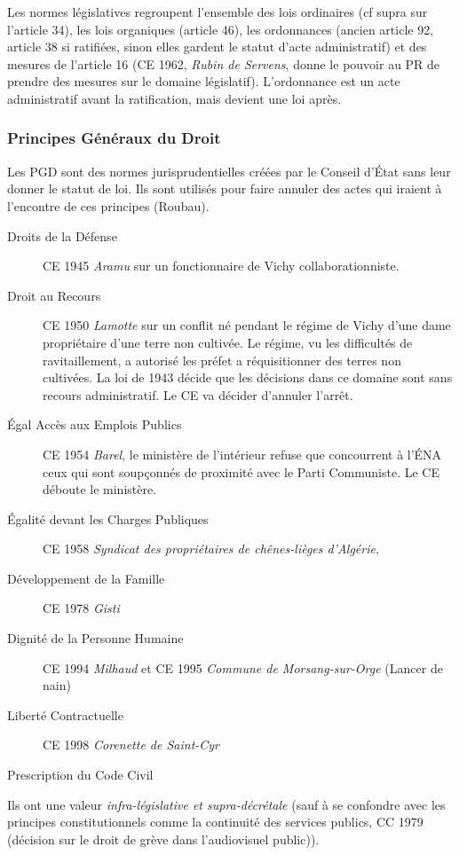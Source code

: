 \documentclass[math]{cours}
\begin{document}
Les normes législatives regroupent l'ensemble des lois ordinaires (cf supra sur l'article 34), les lois organiques (article 46), les ordonnances (ancien article 92, article 38 si ratifiées, sinon elles gardent le statut d'acte administratif) et des mesures de l'article 16 (CE 1962, \emph{Rubin de Servens}, donne le pouvoir au PR de prendre des mesures sur le domaine législatif).
L'ordonnance est un acte administratif avant la ratification, mais devient une loi après.

\subsubsection{Principes Généraux du Droit}
Les PGD sont des normes jurisprudentielles créées par le Conseil d'État sans leur donner le statut de loi.
Ils sont utilisés pour faire annuler des actes qui iraient à l'encontre de ces principes (Roubau).
\begin{description}
	\item[Droits de la Défense] CE 1945 \emph{Aramu} sur un fonctionnaire de Vichy collaborationniste.
	\item[Droit au Recours] CE 1950 \emph{Lamotte} sur un conflit né pendant le régime de Vichy d'une dame propriétaire d'une terre non cultivée.
	      Le régime, vu les difficultés de ravitaillement, a autorisé les préfet a réquisitionner des terres non cultivées.
	      La loi de 1943 décide que les décisions dans ce domaine sont sans recours administratif.
	      Le CE va décider d'annuler l'arrêt.
	\item[Égal Accès aux Emplois Publics] CE 1954 \emph{Barel}, le ministère de l'intérieur refuse que concourrent à l'ÉNA ceux qui sont soupçonnés de proximité avec le Parti Communiste.
	      Le CE déboute le ministère.
	\item[Égalité devant les Charges Publiques] CE 1958 \emph{Syndicat des propriétaires de chênes-lièges d'Algérie},
	\item[Développement de la Famille] CE 1978 \emph{Gisti}
	\item[Dignité de la Personne Humaine] CE 1994 \emph{Milhaud} et CE 1995 \emph{Commune de Morsang-sur-Orge} (Lancer de nain)
	\item[Liberté Contractuelle] CE 1998 \emph{Corenette de Saint-Cyr}
	\item[Prescription du Code Civil]
\end{description}
Ils ont une valeur \emph{infra-législative et supra-décrétale} (sauf à se confondre avec les principes constitutionnels comme la continuité des services publics, CC 1979 (décision sur le droit de grève dans l'audiovisuel public)).
\end{document}

